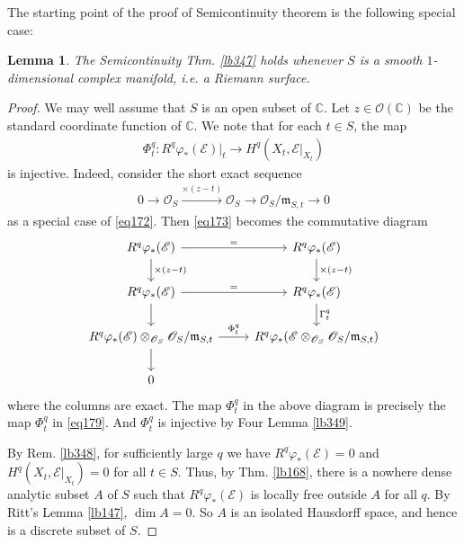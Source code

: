 \documentclass[12pt,b5paper,notitlepage]{report}
\theoremstyle{definition}
\theoremstyle{plain}
\newtheorem{lm}[df]{Lemma}
\newcommand{\scr}{\mathscr}
\newcommand{\Cbb}{\mathbb C}
\newcommand{\mk}{\mathfrak m}
\numberwithin{equation}{section}
\begin{document}
The starting point of the proof of Semicontinuity theorem is the following special case:


\begin{lm}\label{lb352}
The Semicontinuity Thm. \ref{lb347} holds whenever $S$ is a smooth $1$-dimensional complex manifold, i.e. a Riemann surface.
\end{lm}



\begin{proof}
We may well assume that $S$ is an open subset of $\Cbb$. Let $z\in\scr O(\Cbb)$ be the standard coordinate function of $\Cbb$. We note that for each $t\in S$, the map
\begin{align}
\Phi_t^q: R^q\varphi_*(\scr E)|_t\rightarrow H^q(X_t,\scr E|_{X_t})  \label{eq179}
\end{align}
is injective. Indeed, consider the short exact sequence
\begin{align*}
0\rightarrow \scr O_S\xrightarrow{\times (z-t)}\scr O_S\rightarrow \scr O_S/\mk_{S,t}\rightarrow 0
\end{align*}
as a special case of \eqref{eq172}. Then \eqref{eq173} becomes the commutative diagram
\begin{equation}\label{eq180}
\begin{tikzcd}
R^q\varphi_*(\scr E)\arrow[r,"="] \arrow[d,"\times (z-t)"]           & R^q\varphi_*(\scr E) \arrow[d,"\times (z-t)"]           \\
R^q\varphi_*(\scr E) \arrow[d] \arrow[r, "="] & R^q\varphi_*(\scr E) \arrow[d, "\Gamma_t^q"] \\
R^q\varphi_*(\scr E)\otimes_{\scr O_S}\scr O_S/\mk_{S,t} \arrow[r, "\Phi_t^q"] \arrow[d]   & R^q\varphi_*(\scr E\otimes_{\scr O_S}\scr O_S/\mk_{S,t})                     \\
0                               &                      
\end{tikzcd}
\end{equation}
where the columns are exact. The map $\Phi_t^q$ in the above diagram is precisely the map $\Phi_t^q$ in \eqref{eq179}. And $\Phi_t^q$ is injective by Four Lemma \ref{lb349}. 


By Rem. \ref{lb348}, for sufficiently large $q$ we have $R^q\varphi_*(\scr E)=0$ and $H^q(X_t,\scr E|_{X_t})=0$ for all $t\in S$. Thus, by Thm. \ref{lb168}, there is a nowhere dense analytic subset $A$ of $S$ such that $R^q\varphi_*(\scr E)$ is locally free outside $A$ for all $q$. By Ritt's Lemma \ref{lb147}, $\dim A=0$. So $A$ is an isolated Hausdorff space, and hence is a discrete subset of $S$.


\end{proof}
\end{document}
